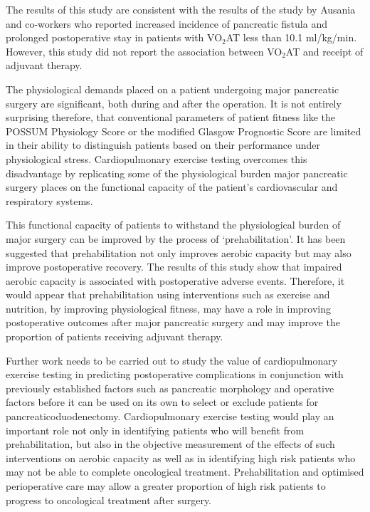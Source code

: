 The results of this study are consistent with the results of the study by Ausania and co-workers\parencite{ausania_effects_2012} who reported increased incidence of pancreatic fistula and prolonged postoperative stay in patients with VO$_2$AT less than 10.1 ml/kg/min. However, this study did not report the association between VO$_2$AT and receipt of adjuvant therapy.

The physiological demands placed on a patient undergoing major pancreatic surgery are significant, both during and after the operation. It is not entirely surprising therefore, that conventional parameters of patient fitness like the POSSUM Physiology Score or the modified Glasgow Prognostic Score are limited in their ability to distinguish patients based on their performance under physiological stress. Cardiopulmonary exercise testing overcomes this disadvantage by replicating some of the physiological burden major pancreatic surgery places on the functional capacity of the patient's cardiovascular and respiratory systems.

This functional capacity of patients to withstand the physiological burden of major surgery can be improved by the process of ‘prehabilitation’.\parencite{topp_effect_2002} It has been suggested that prehabilitation not only improves aerobic capacity\parencite{jones_effects_2007} but may also improve postoperative recovery.\parencite{mayo_impact_2011, pehlivan_effects_2011} The results of this study show that impaired aerobic capacity is associated with postoperative adverse events. Therefore, it would appear that prehabilitation using interventions such as exercise and nutrition, by improving physiological fitness, may have a role in improving postoperative outcomes after major pancreatic surgery and may improve the proportion of patients receiving adjuvant therapy.

Further work needs to be carried out to study the value of cardiopulmonary exercise testing in predicting postoperative complications in conjunction with previously established factors such as pancreatic morphology and operative factors before it can be used on its own to select or exclude patients for pancreaticoduodenectomy. Cardiopulmonary exercise testing would play an important role not only in identifying patients who will benefit from prehabilitation, but also in the objective measurement of the effects of such interventions on aerobic capacity as well as in identifying high risk patients who may not be able to complete oncological treatment. Prehabilitation and optimised perioperative care may allow a greater proportion of high risk patients to progress to oncological treatment after surgery.